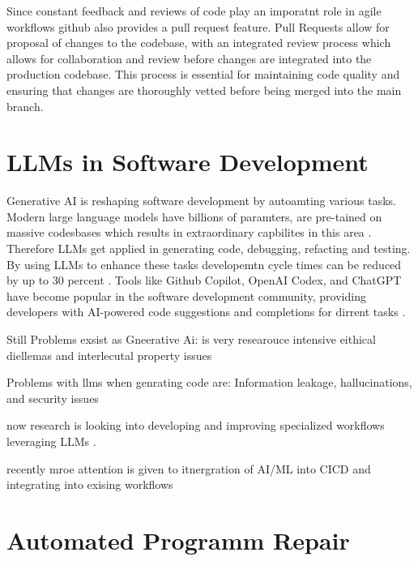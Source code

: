 Since constant feedback and reviews of code play an imporatnt role in agile workflows github also provides a pull request feature. Pull Requests allow for proposal of changes to the codebase, with an integrated review process which allows for collaboration and review before changes are integrated into the production codebase. This process is essential for maintaining code quality and ensuring that changes are thoroughly vetted before being merged into the main branch. \cite{githubdoc}

\section{LLMs in Software Development}
Generative AI is reshaping software development by autoamting various tasks. Modern large language models have billions of paramters, are pre-tained on massive codesbases which results in extraordinary capbilites in this area  \cite{chenUnveilingPitfallsUnderstanding2025}.
Therefore LLMs get applied in generating code, debugging, refacting and testing. \cite{sauvolaFutureSoftwareDevelopment2024,bhargavmallampatiRoleGenerativeAI2025} By using LLMs to enhance these tasks developemtn cycle times can be reduced by up to 30 percent \cite{bhargavmallampatiRoleGenerativeAI2025}.
Tools like Github Copilot, OpenAI Codex, and ChatGPT have become popular in the software development community, providing developers with AI-powered code suggestions and completions for dirrent tasks \cite{bhargavmallampatiRoleGenerativeAI2025}.

Still Problems exsist as Gneerative Ai:
is very researouce intensive
eithical diellemas and interlecutal property issues \cite{sauvolaFutureSoftwareDevelopment2024}


Problems with llms when genrating code are: Information leakage, hallucinations, and security issues

now research is looking into developing and improving specialized workflows leveraging LLMs \cite{puvvadiCodingAgentsComprehensive2025}.

recently mroe attention is given to itnergration of AI/ML into CICD
\cite{mohammedAIDrivenContinuousIntegration2024} and integrating into exising workflows \cite{sauvolaFutureSoftwareDevelopment2024}

\section{Automated Programm Repair}

